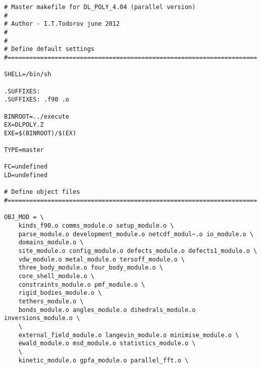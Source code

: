 \begin{verbatim}
# Master makefile for DL_POLY_4.04 (parallel version)
#
# Author - I.T.Todorov june 2012
#
#
# Define default settings
#=====================================================================

SHELL=/bin/sh

.SUFFIXES:
.SUFFIXES: .f90 .o

BINROOT=../execute
EX=DLPOLY.Z
EXE=$(BINROOT)/$(EX)

TYPE=master

FC=undefined
LD=undefined

# Define object files
#=====================================================================

OBJ_MOD = \
	kinds_f90.o comms_module.o setup_module.o \
	parse_module.o development_module.o netcdf_modul~.o io_module.o \
	domains_module.o \
	site_module.o config_module.o defects_module.o defects1_module.o \
	vdw_module.o metal_module.o tersoff_module.o \
	three_body_module.o four_body_module.o \
	core_shell_module.o \
	constraints_module.o pmf_module.o \
	rigid_bodies_module.o \
	tethers_module.o \
	bonds_module.o angles_module.o dihedrals_module.o inversions_module.o \
	\
	external_field_module.o langevin_module.o minimise_module.o \
	ewald_module.o msd_module.o statistics_module.o \
	\
	kinetic_module.o gpfa_module.o parallel_fft.o \


\end{verbatim}
